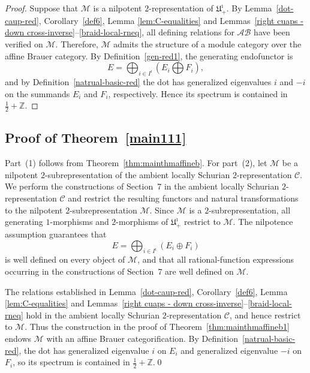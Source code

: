 \documentclass[a4,10pt]{amsart}
\numberwithin{equation}{section}
\theoremstyle{definition}
\newcommand{\AB}{\mathcal{AB}}
\begin{document}
\begin{proof} Suppose that $\mathcal M$ is a nilpotent $2$-representation  of $\mathfrak U^\imath_+$. By   Lemma~\ref{dot-caup-red}, Corollary~\ref{def6}, Lemma \ref{lem:C-equalities} and  Lemmas~\ref{right cuaps - down cross-inverse}--\ref{braid-local-rneq}, all defining relations for $\AB$ have been verified on  $\mathcal M$. Therefore, 
$\mathcal M$ admits the structure of a module category over the affine Brauer category. By Definition~\ref{gen-red1}, the generating endofunctor is 
$$E=\bigoplus_{i\in I^\imath} (E_i\bigoplus F_i),$$
and by Definition~\ref{natrual-basic-red} the dot has generalized eigenvalues $i$ and $-i$ on the summands $E_i$ and $F_i$, respectively. Hence its spectrum is contained in $\frac12+\mathbb Z$. 
\end{proof}



\subsection{Proof of Theorem~\ref{main111}} 
Part~(1) follows from Theorem~\ref{thm:mainthmaffineb}.
For part~(2), let $\mathcal M$ be a nilpotent
$2$-subrepresentation of the ambient locally Schurian
$2$-representation $\mathcal C$. We perform the constructions of Section~7 in the ambient locally
Schurian \(2\)-representation \(\mathcal C\) and restrict the
resulting functors and natural transformations to the nilpotent
\(2\)-subrepresentation \(\mathcal M\).
Since $\mathcal M$ is a
$2$-subrepresentation, all generating $1$-morphisms and
$2$-morphisms of $\mathfrak U^\imath_+$ restrict to
$\mathcal M$. The nilpotence assumption guarantees that
\[
E=\bigoplus_{i\in I^\imath}(E_i\oplus F_i)
\]
is well defined on every object of $\mathcal M$, and that all
rational-function expressions occurring in the constructions of
Section~7 are well defined on $\mathcal M$.

The relations established in Lemma~\ref{dot-caup-red},
Corollary~\ref{def6},  Lemma \ref{lem:C-equalities} and Lemmas~\ref{right cuaps - down cross-inverse}--\ref{braid-local-rneq}  hold in the ambient
locally Schurian $2$-representation $\mathcal C$, and hence
restrict to $\mathcal M$. Thus the construction in the proof of
Theorem~\ref{thm:mainthmaffineb1} endows $\mathcal M$ with an affine Brauer
categorification. By Definition~\ref{natrual-basic-red}, the dot has generalized
eigenvalue $i$ on $E_i$ and generalized eigenvalue $-i$ on
$F_i$, so its spectrum is contained in
$\frac12+\mathbb Z$.\qed
\end{document}
